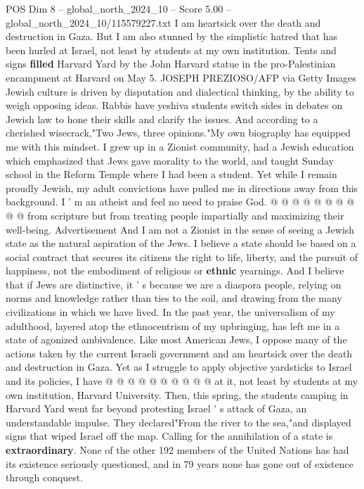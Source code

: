 \begin{textsample}{POS Dim 8 – global\_north\_2024\_10 – Score 5.00 – global\_north\_2024\_10/115579227.txt}  \label{ex:f8_pos_243}
I am heartsick over the death and destruction in Gaza.
But I am also stunned by the simplistic hatred that has been hurled at Israel, not least by students at my own institution.
Tents and signs \textbf{filled} Harvard Yard by the John Harvard statue in the pro-Palestinian encampment at Harvard on May 5.
JOSEPH PREZIOSO/AFP via Getty Images Jewish culture is driven by disputation and dialectical thinking, by the ability to weigh opposing ideas.
Rabbis have yeshiva students switch sides in debates on Jewish law to hone their skills and clarify the issues.
And according to a cherished wisecrack,"Two Jews, three opinions."My own biography has equipped me with this mindset.
I grew up in a Zionist community, had a Jewish education which emphasized that Jews gave morality to the world, and taught Sunday school in the Reform Temple where I had been a student.
Yet while I remain proudly Jewish, my adult convictions have pulled me in directions away from this background.
I ' m an atheist and feel no need to praise God. @ @ @ @ @ @ @ @ @ @ from scripture but from treating people impartially and maximizing their well-being.
Advertisement And I am not a Zionist in the sense of seeing a Jewish state as the natural aspiration of the Jews.
I believe a state should be based on a social contract that secures its citizens the right to life, liberty, and the pursuit of happiness, not the embodiment of religious or \textbf{ethnic} yearnings.
And I believe that if Jews are distinctive, it ' s because we are a diaspora people, relying on norms and knowledge rather than ties to the soil, and drawing from the many civilizations in which we have lived.
In the past year, the universalism of my adulthood, layered atop the ethnocentrism of my upbringing, has left me in a state of agonized ambivalence.
Like most American Jews, I oppose many of the actions taken by the current Israeli government and am heartsick over the death and destruction in Gaza.
Yet as I struggle to apply objective yardsticks to Israel and its policies, I have @ @ @ @ @ @ @ @ @ @ at it, not least by students at my own institution, Harvard University.
Then, this spring, the students camping in Harvard Yard went far beyond protesting Israel ' s attack of Gaza, an understandable impulse.
They declared"From the river to the sea,"and displayed signs that wiped Israel off the map.
Calling for the annihilation of a state is \textbf{extraordinary}.
None of the other 192 members of the United Nations has had its existence seriously questioned, and in 79 years none has gone out of existence through conquest.

\end{textsample}
